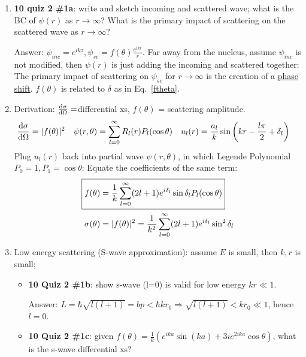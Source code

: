 \documentclass{school-22.101-notes}
\begin{document}
\clearpage
\begin{enumerate}
\item \textbf{10 quiz 2 \#1a}: write and sketch incoming and scattered wave; what is the BC of $\psi(r)$ as $r \to \infty$? What is the primary impact of scattering on the scattered wave as $r \to \infty$? 

Answer: $\psi_{inc} = e^{ikz}, \psi_{sc} = f(\theta) \frac{e^{ikr}}{r}$. Far away from the nucleus, assume $\psi_{inc}$ is not modified, then $\psi(r)$ is just adding the incoming and scattered together: 
The primary impact of scattering on $\psi_{sc}$ for $r \to \infty$ is the creation of a \uline{phase shift}. $f(\theta)$ is related to $\delta$ as in Eq.~\ref{ftheta}. 

\item Derivation: $\frac{\mathrm{d}\sigma}{\mathrm{d}\Omega} = $differential xs, $f(\theta)$ = scattering amplitude. 
\begin{align} 
  \frac{\mathrm{d}\sigma}{\mathrm{d}\Omega} &= |f(\theta)|^2  
  & \psi(r,\theta) &= \displaystyle\sum_{l=0}^{\infty} R_l (r) P_l (\cos \theta) 
  &  u_l (r) &= \frac{a_l}{k} \sin \left( kr - \frac{l \pi}{2} + \delta_l \right) 
    \end{align}
 Plug $u_l(r)$ back into partial wave $\psi(r,\theta)$, in which Legende Polynomial $P_0 = 1, P_1 = \cos \theta$:
Equate the coefficients of the same term: 
\begin{align}
\Aboxed{ f(\theta) &= \frac{1}{k} \Sum_{l=0}^{\infty} (2l+1) e^{i \delta_l} \sin \delta_l P_l (\cos \theta) } \label{ftheta} \\
\sigma (\theta) &= |f(\theta)|^2 =  \frac{1}{k^2} \Sum_{l=0}^{\infty} (2l+1) e^{i \delta_l} \sin^2 \delta_l 
\end{align}
%
\item Low energy scattering (S-wave approximation): assume $E$ is small, then $k,r$ is small; 
  \begin{itemize}
  \item \textbf{10 Quiz 2 \#1b}: show s-wave (l=0) is valid for low energy $kr \ll 1$. 

Answer: $L = \hbar \sqrt{l(l+1)} = bp < \hbar k r_0 \Rightarrow \sqrt{l(l+1)} < kr_0 \ll 1$, hence $l=0$. 

  \item \textbf{10 Quiz 2 \#1c}: given $f(\theta) = \frac{1}{k} \left( e^{ika} \sin(ka) + 3 i e^{2ika} \cos \theta \right)$, what is the s-wave differential xs? 


\end{itemize}
\end{enumerate}
\end{document}
